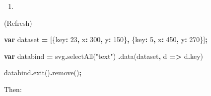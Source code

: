 \documentclass[
  openany]{book}
\newenvironment{Shaded}{\begin{snugshade}}{\end{snugshade}}
\newcommand{\AttributeTok}[1]{\textcolor[rgb]{0.77,0.63,0.00}{#1}}
\newcommand{\DataTypeTok}[1]{\textcolor[rgb]{0.13,0.29,0.53}{#1}}
\newcommand{\DecValTok}[1]{\textcolor[rgb]{0.00,0.00,0.81}{#1}}
\newcommand{\FunctionTok}[1]{\textcolor[rgb]{0.00,0.00,0.00}{#1}}
\newcommand{\KeywordTok}[1]{\textcolor[rgb]{0.13,0.29,0.53}{\textbf{#1}}}
\newcommand{\NormalTok}[1]{#1}
\newcommand{\OperatorTok}[1]{\textcolor[rgb]{0.81,0.36,0.00}{\textbf{#1}}}
\newcommand{\SpecialCharTok}[1]{\textcolor[rgb]{0.00,0.00,0.00}{#1}}
\newcommand{\StringTok}[1]{\textcolor[rgb]{0.31,0.60,0.02}{#1}}
\newcommand{\VerbatimStringTok}[1]{\textcolor[rgb]{0.31,0.60,0.02}{#1}}
\providecommand{\tightlist}{%
  \setlength{\itemsep}{0pt}\setlength{\parskip}{0pt}}
\begin{document}
\begin{enumerate}
\def\labelenumi{\arabic{enumi}.}
\setcounter{enumi}{1}
\tightlist
\item
\end{enumerate}

(Refresh)

\begin{Shaded}
\begin{Highlighting}[]
\KeywordTok{var}\NormalTok{ dataset }\OperatorTok{=}\NormalTok{ [\{}\DataTypeTok{key}\OperatorTok{:} \DecValTok{23}\OperatorTok{,} \DataTypeTok{x}\OperatorTok{:} \DecValTok{300}\OperatorTok{,} \DataTypeTok{y}\OperatorTok{:} \DecValTok{150}\NormalTok{\}}\OperatorTok{,}
\NormalTok{              \{}\DataTypeTok{key}\OperatorTok{:} \DecValTok{5}\OperatorTok{,} \DataTypeTok{x}\OperatorTok{:} \DecValTok{450}\OperatorTok{,} \DataTypeTok{y}\OperatorTok{:} \DecValTok{270}\NormalTok{\}]}\OperatorTok{;}
              
\KeywordTok{var}\NormalTok{ databind }\OperatorTok{=}\NormalTok{ svg}\OperatorTok{.}\FunctionTok{selectAll}\NormalTok{(}\StringTok{"text"}\NormalTok{)}
  \OperatorTok{.}\FunctionTok{data}\NormalTok{(dataset}\OperatorTok{,}\NormalTok{ d }\KeywordTok{=\textgreater{}}\NormalTok{ d}\OperatorTok{.}\AttributeTok{key}\NormalTok{)}

\NormalTok{databind}\OperatorTok{.}\FunctionTok{exit}\NormalTok{()}\OperatorTok{.}\FunctionTok{remove}\NormalTok{()}\OperatorTok{;}
\end{Highlighting}
\end{Shaded}

Then:

\begin{Shaded}
\end{Shaded}
\end{document}

